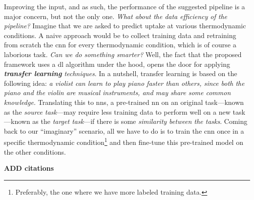 Improving the input, and as such, the performance of the suggested pipeline is a
major concern, but not the only one. \emph{What about the data
efficiency of the pipeline?} Imagine that we are asked to
predict  uptake at various thermodynamic conditions. A naive approach would be to collect training data and retraining from scratch the \gls{cnn} for every thermodynamic
condition, which is of course a laborious task. \emph{Can we do something
smarter?} Well, the fact that the proposed framework uses a \gls{dl}
algorithm under the hood, opens the door for
applying \emph{\textbf{transfer learning} techniques}.
In a nutshell, transfer learning\parencite{Zhuang2019, Ma2020, Kang2023} is
based on the following idea: \emph{a violist can learn to play piano faster than
others, since both the piano and the violin are musical instruments, and may
share some common knowledge.} Translating this to \glspl{nn}, a pre-trained
\gls{nn} on an original task---known as the \emph{source task}---may require less training data to perform well on a new task---known as
the \emph{target task}---if there is some \emph{similarity between
the tasks}. Coming back to our ``imaginary'' scenario, all we have to do is to
train the \gls{cnn} once in a specific thermodynamic
condition\footnote{Preferably, the one where we have more labeled training
data.} and then fine-tune this pre-trained
model on the other conditions.

\textbf{ADD citations}

